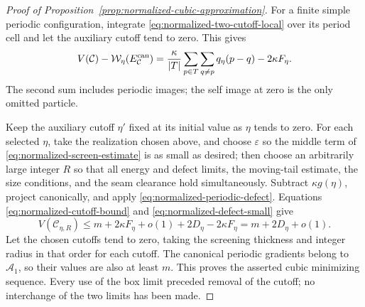 \begin{proof}[Proof of Proposition~\ref{prop:normalized-cubic-approximation}]
For a finite simple periodic configuration, integrate
\eqref{eq:normalized-two-cutoff-local} over its period cell and let the
auxiliary cutoff tend to zero. This gives
\begin{equation}
 V(\mathcal C)-\mathcal W_\eta(E^{\rm can}_{\mathcal C})
   =\frac{\kappa}{|T|}\sum_{p\in T}\sum_{q\ne p}q_\eta(p-q)
                        -2\kappa F_\eta.
 \label{eq:normalized-periodic-defect}
\end{equation}
The second sum includes periodic images; the self image at zero is
the only omitted particle.

Keep the auxiliary cutoff $\eta'$ fixed at its initial value as $\eta$
tends to zero.  For each selected $\eta$, take the realization chosen
above, and choose $\varepsilon$ so the middle
term of \eqref{eq:normalized-screen-estimate} is as small as desired;
then choose an arbitrarily large integer $R$ so that all energy and
defect limits, the moving-tail estimate, the size conditions, and the
seam clearance hold simultaneously.  Subtract $\kappa g(\eta)$,
project canonically, and apply \eqref{eq:normalized-periodic-defect}.
Equations \eqref{eq:normalized-cutoff-bound} and
\eqref{eq:normalized-defect-small} give
\[
 V(\mathcal C_{\eta,R})
   \le m+2\kappa F_\eta+o(1)+2D_\eta-2\kappa F_\eta
   =m+2D_\eta+o(1).
\]
Let the chosen cutoffs tend to zero, taking the screening thickness
and integer radius in that order for each cutoff.  The canonical
periodic gradients belong to $\mathcal A_1$, so their values are also
at least $m$.  This proves the asserted cubic minimizing sequence.
Every use of the box limit preceded removal of the cutoff; no
interchange of the two limits has been made.
\end{proof}
